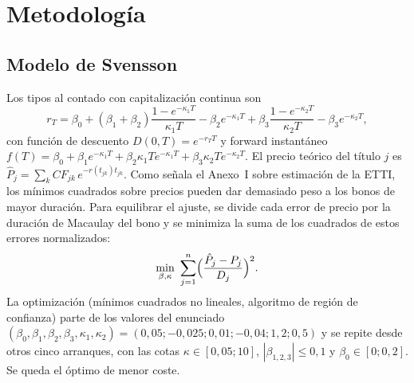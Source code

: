 \documentclass[a4paper,12pt]{article}
\begin{document}
\section{Metodología}
\subsection{Modelo de Svensson}
Los tipos al contado con capitalización continua son
\begin{equation}r_T=\beta_0+(\beta_1+\beta_2)\frac{1-e^{-\kappa_1T}}{\kappa_1T}-\beta_2e^{-\kappa_1T}+\beta_3\frac{1-e^{-\kappa_2T}}{\kappa_2T}-\beta_3e^{-\kappa_2T},\end{equation}
con función de descuento $D(0,T)=e^{-r_TT}$ y forward instantáneo $f(T)=\beta_0+\beta_1e^{-\kappa_1T}+\beta_2\kappa_1Te^{-\kappa_1T}+\beta_3\kappa_2Te^{-\kappa_2T}$. El precio teórico del título $j$ es $\hat P_j=\sum_kCF_{jk}\,e^{-r(t_{jk})t_{jk}}$. Como señala el Anexo~I sobre estimación de la ETTI, los mínimos cuadrados sobre precios pueden dar demasiado peso a los bonos de mayor duración. Para equilibrar el ajuste, se divide cada error de precio por la duración de Macaulay del bono y se minimiza la suma de los cuadrados de estos errores normalizados:
\begin{equation}\min_{\beta,\kappa}\ \sum_{j=1}^{n}\Bigl(\frac{\hat P_j-P_j}{D_j}\Bigr)^2.\end{equation}
La optimización (mínimos cuadrados no lineales, algoritmo de región de confianza) parte de los valores del enunciado $(\beta_0,\beta_1,\beta_2,\beta_3,\kappa_1,\kappa_2)=(0{,}05;-0{,}025;0{,}01;-0{,}04;1{,}2;0{,}5)$ y se repite desde otros cinco arranques, con las cotas $\kappa\in[0{,}05;10]$, $|\beta_{1,2,3}|\le0{,}1$ y $\beta_0\in[0;0{,}2]$. Se queda el óptimo de menor coste.
\end{document}
